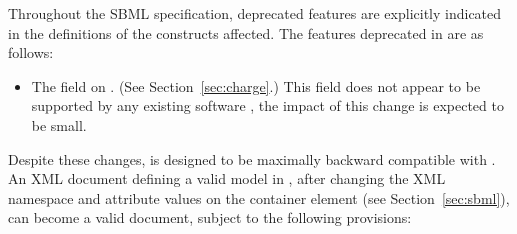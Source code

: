 Throughout the SBML specification, deprecated features are
explicitly indicated in the definitions of the constructs
affected.  The features deprecated in \sbmltwotwo are as follows:
\begin{itemize}
  
\item The  field on \Species.  (See
  Section~\ref{sec:charge}.)  This field does not appear to be
  supported by any existing software
  , the impact of this change is expected to
  be small.

\end{itemize}

Despite these changes, \sbmltwotwo is designed to be maximally
backward compatible with \sbmltwoone.  An XML document defining a
valid model in \sbmltwoone, after changing the XML namespace and
 attribute values on the  container
element (see Section~\ref{sec:sbml}), can become a valid
\sbmltwotwo document, subject to the following provisions:

